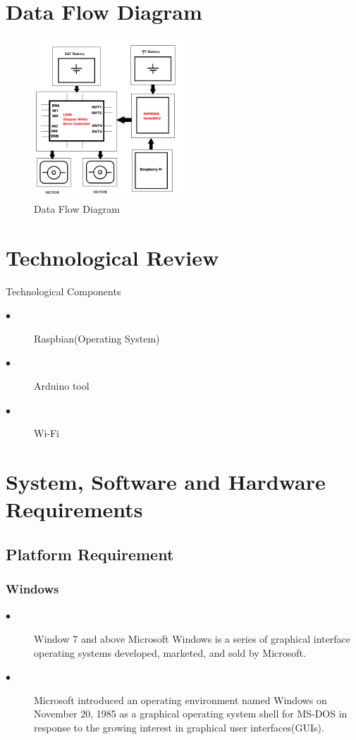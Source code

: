 \documentclass[sigconf]{acmart}
\begin{document}
\section{Data Flow Diagram}
\begin{figure}[ht!]
  \includegraphics[width=0.5\textwidth]{FlowDiagram.png}
  \caption{Data Flow Diagram}
\end{figure}

\section{Technological Review}
Technological Components
\begin{description}
\item[$\bullet$] Raspbian(Operating System)
\item[$\bullet$] Arduino tool
\item[$\bullet$] Wi-Fi
\end{description}

\section{System, Software and Hardware Requirements}
\subsection{Platform Requirement}
\subsubsection{Windows}
\begin{description}
\item[$\bullet$] Window 7 and above Microsoft Windows is a series of
graphical interface operating systems developed, marketed,
and sold by Microsoft.
\item[$\bullet$] Microsoft introduced an operating environment named Windows on November 20, 1985 as a graphical operating system shell for MS-DOS in response to the growing interest in graphical user interfaces(GUIs).
\end{description}
\end{document}
